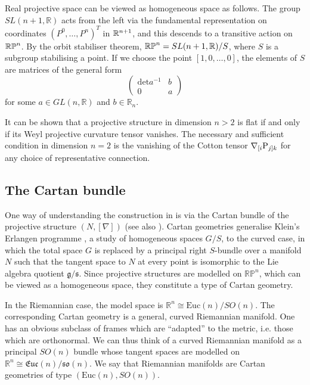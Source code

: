 \begin{rmk}
Real projective space can be viewed as homogeneous space as follows. 
The group $SL(n+1,\mathbb{R})$ acts from the left via the fundamental representation on coordinates $(P^0,\dots,P^n)^T$ in $\mathbb{R}^{n+1}$, and this descends to a transitive action on $\mathbb{RP}^n$. By the orbit stabiliser theorem, $\mathbb{RP}^n=SL(n+1,\mathbb{R})/S$, where $S$ is a subgroup stabilising a point. If we choose the point $[1,0,\dots,0]$, the elements of $S$ are matrices of the general form
\[
\begin{pmatrix}\mathrm{det}a^{-1} & b\\
0 & a
\end{pmatrix}
\]
for some $a\in GL(n,\mathbb{R})$ and $b\in\mathbb{R}_{n}$.
\end{rmk} 

\begin{rmk}
It can be shown that a projective structure in dimension $n>2$ is flat if and only if its Weyl projective curvature tensor vanishes. The necessary and sufficient condition in dimension $n=2$ is the vanishing of the Cotton tensor $\nabla_{[i}\mathrm{P}_{j]k}$ for any choice of representative connection.
\end{rmk}

\subsection{The Cartan bundle}

One way of understanding the construction in \cite{DM}
is via the Cartan bundle \cite{Cartan} of the projective structure $(N,[\nabla])$ (see also \cite{KobNag,Sharpe}). Cartan geometries generalise Klein's Erlangen programme \cite{Klein}, a study of homogeneous spaces $G/S$, to the curved case, in which the total space $G$ is replaced by a principal right $S$-bundle over a manifold $N$ such that the tangent space to $N$ at every point is isomorphic to the Lie algebra quotient $\mathfrak{g}/\mathfrak{s}$. Since projective structures are modelled on $\mathbb{RP}^{n}$, which can be viewed as a homogeneous space, they constitute a type of Cartan geometry.

In the Riemannian case, the model space is $\mathbb{R}^{n}\cong\mathrm{Euc}(n)/SO(n)$. The corresponding Cartan geometry is a general, curved Riemannian manifold. One has an obvious subclass of frames which are ``adapted'' to the metric, i.e. those which are orthonormal. We can thus think of a curved Riemannian manifold as a principal $SO(n)$ bundle whose tangent spaces are modelled on $\mathbb{R}^{n}\cong\mathfrak{Euc}(n)/\mathfrak{so}(n)$. We say that Riemannian manifolds are Cartan geometries of type $(\mathrm{Euc}(n),SO(n))$.

